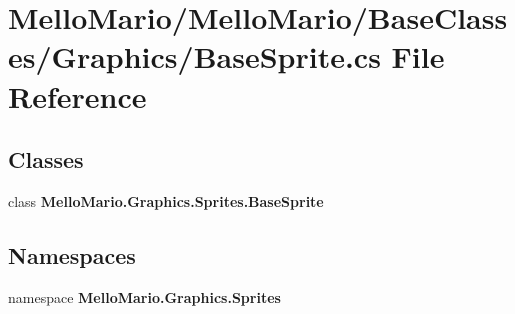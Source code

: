 \section{Mello\+Mario/\+Mello\+Mario/\+Base\+Classes/\+Graphics/\+Base\+Sprite.cs File Reference}
\label{BaseSprite_8cs}
\subsection*{Classes}
\begin{DoxyCompactItemize}
\item 
class \textbf{ Mello\+Mario.\+Graphics.\+Sprites.\+Base\+Sprite}
\end{DoxyCompactItemize}
\subsection*{Namespaces}
\begin{DoxyCompactItemize}
\item 
namespace \textbf{ Mello\+Mario.\+Graphics.\+Sprites}
\end{DoxyCompactItemize}

